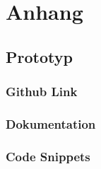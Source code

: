 
\chapter{Anhang}

\section{Prototyp}
\subsection{Github Link}
\subsection{Dokumentation}
\subsection{Code Snippets}

\clearpage


